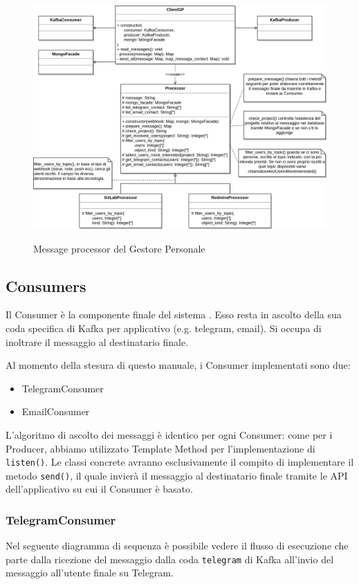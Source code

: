     \begin{figure}[H]
        \centering
        \includegraphics[width=\textwidth]{img/GP-Processor.png}\\
        \caption{Message processor del Gestore Personale}
        \label{fig:GP-Processor}
    \end{figure}


\subsection{Consumers}
Il Consumer è la componente finale del sistema \progetto. Esso resta in ascolto della sua coda specifica di Kafka per applicativo (e.g. telegram, email).
Si occupa di inoltrare il messaggio al destinatario finale.

Al momento della stesura di questo manuale, i Consumer implementati sono due:

\begin{itemize}
    \item TelegramConsumer
    \item EmailConsumer
\end{itemize}

L'algoritmo di ascolto dei messaggi è identico per ogni Consumer: come per i Producer, abbiamo utilizzato
Template Method per l'implementazione di \texttt{listen()}.
Le classi concrete avranno esclusivamente il compito di implementare il metodo \texttt{send()}, il quale invierà il messaggio
al destinatario finale tramite le API dell'applicativo su cui il Consumer è basato.


\subsubsection{TelegramConsumer}
Nel seguente diagramma di sequenza è possibile vedere il flusso di esecuzione che parte dalla ricezione del messaggio dalla coda \texttt{telegram}
di Kafka all'invio del messaggio all'utente finale su Telegram.

